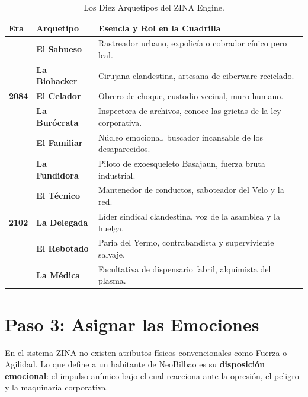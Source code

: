 \begin{table}[htbp]
\centering
\small
\begin{tabularx}{\textwidth}{l l X}
\toprule
\textbf{Era} & \textbf{Arquetipo} & \textbf{Esencia y Rol en la Cuadrilla} \\
\midrule
\multirow{5}{*}{\textbf{2084}} 
& \textbf{El Sabueso} & Rastreador urbano, expolicía o cobrador cínico pero leal. \\
& \textbf{La Biohacker} & Cirujana clandestina, artesana de ciberware reciclado. \\
& \textbf{El Celador} & Obrero de choque, custodio vecinal, muro humano. \\
& \textbf{La Burócrata} & Inspectora de archivos, conoce las grietas de la ley corporativa. \\
& \textbf{El Familiar} & Núcleo emocional, buscador incansable de los desaparecidos. \\
\midrule
\multirow{5}{*}{\textbf{2102}} 
& \textbf{La Fundidora} & Piloto de exoesqueleto Basajaun, fuerza bruta industrial. \\
& \textbf{El Técnico} & Mantenedor de conductos, saboteador del Velo y la red. \\
& \textbf{La Delegada} & Líder sindical clandestina, voz de la asamblea y la huelga. \\
& \textbf{El Rebotado} & Paria del Yermo, contrabandista y superviviente salvaje. \\
& \textbf{La Médica} & Facultativa de dispensario fabril, alquimista del plasma. \\
\bottomrule
\end{tabularx}
\caption{Los Diez Arquetipos del ZINA Engine.}
\end{table}

\section{Paso 3: Asignar las Emociones}
En el sistema ZINA no existen atributos físicos convencionales como Fuerza o Agilidad. Lo que define a un habitante de NeoBilbao es su \textbf{disposición emocional}: el impulso anímico bajo el cual reacciona ante la opresión, el peligro y la maquinaria corporativa.


